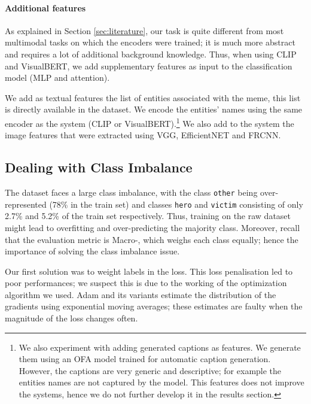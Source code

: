 \paragraph{Additional features}
As explained in Section \ref{sec:literature}, our task is quite different from most multimodal tasks on which the encoders were trained; it is much more abstract and requires a lot of additional background knowledge.
Thus, when using CLIP and VisualBERT, we add supplementary features as input to the classification model (MLP and attention).

We add as textual features the list of entities associated with the meme, this list is directly available in the dataset. We encode the entities' names using the same encoder as the system (CLIP or VisualBERT).\footnote{We also experiment with adding generated captions as features. We generate them using an OFA model trained for automatic caption generation. However, the captions are very generic and descriptive; for example the entities names are not captured by the model. This features does not improve the systems, hence we do not further develop it in the results section.} We also add to the system the image features that were extracted using VGG, EfficientNET and FRCNN.

\subsection{Dealing with Class Imbalance}
\label{sec:subsampling}
The dataset faces a large class imbalance, with the class \texttt{other} being over-represented (78\% in the train set) and classes \texttt{hero} and \texttt{victim} consisting of only 2.7\% and 5.2\% of the train set respectively.
Thus, training on the raw dataset might lead to overfitting and over-predicting the majority class.
Moreover, recall that the evaluation metric is Macro-\fone{}, which weighs each class equally; hence the importance of solving the class imbalance issue.

Our first solution was to weight labels in the loss. This loss penalisation led to poor performances; we suspect this is due to the working of the optimization algorithm we used.
Adam and its variants estimate the distribution of the gradients using exponential moving averages; these estimates are faulty when the magnitude of the loss changes often.

